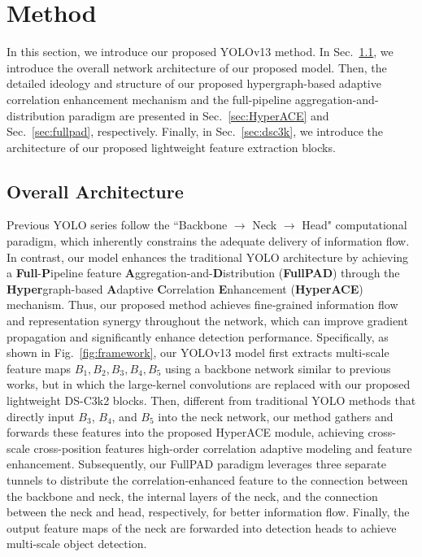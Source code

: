 
\section{Method}
In this section, we introduce our proposed YOLOv13 method. In Sec.~\ref{sec:overall}, we introduce the overall network architecture of our proposed model. Then, the detailed ideology and structure of our proposed hypergraph-based adaptive correlation enhancement mechanism and the full-pipeline aggregation-and-distribution paradigm are presented in Sec.~\ref{sec:HyperACE} and Sec.~\ref{sec:fullpad}, respectively. Finally, in Sec.~\ref{sec:dsc3k}, we introduce the architecture of our proposed lightweight feature extraction blocks.

\subsection{Overall Architecture}
\label{sec:overall}
Previous YOLO series follow the ``Backbone $\to$ Neck $\to$ Head" computational paradigm, which inherently constrains the adequate delivery of information flow. In contrast, our model enhances the traditional YOLO architecture by achieving a \textbf{Full}-\textbf{P}ipeline feature \textbf{A}ggregation-and-\textbf{D}istribution (\textbf{FullPAD}) through the \textbf{Hyper}graph-based \textbf{A}daptive \textbf{C}orrelation \textbf{E}nhancement (\textbf{HyperACE}) mechanism. Thus, our proposed method achieves fine‑grained information flow and representation synergy throughout the network, which can improve gradient propagation and significantly enhance detection performance. Specifically, as shown in Fig.~\ref{fig:framework}, our YOLOv13 model first extracts multi-scale feature maps $B_1, B_2, B_3, B_4, B_5$ using a backbone network similar to previous works, but in which the large-kernel convolutions are replaced with our proposed lightweight DS-C3k2 blocks. Then, different from traditional YOLO methods that directly input $B_3$, $B_4$, and $B_5$ into the neck network, our method gathers and forwards these features into the proposed HyperACE module, achieving cross-scale cross-position features high-order correlation adaptive modeling and feature enhancement. Subsequently, our FullPAD paradigm leverages three separate tunnels to distribute the correlation-enhanced feature to the connection between the backbone and neck, the internal layers of the neck, and the connection between the neck and head, respectively, for better information flow. Finally, the output feature maps of the neck are forwarded into detection heads to achieve multi‑scale object detection. 

